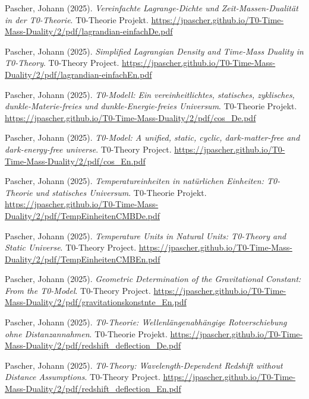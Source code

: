 \documentclass[12pt,a4paper]{article}
\begin{document}
	\begin{thebibliography}{20}
		
		Pascher, Johann (2025). 
		\textit{Vereinfachte Lagrange-Dichte und Zeit-Massen-Dualit\"at in der T0-Theorie}. 
		T0-Theorie Projekt. 
		\url{https://jpascher.github.io/T0-Time-Mass-Duality/2/pdf/lagrandian-einfachDe.pdf}
		
		Pascher, Johann (2025). 
		\textit{Simplified Lagrangian Density and Time-Mass Duality in T0-Theory}. 
		T0-Theory Project. 
		\url{https://jpascher.github.io/T0-Time-Mass-Duality/2/pdf/lagrandian-einfachEn.pdf}
		
		Pascher, Johann (2025). 
		\textit{T0-Modell: Ein vereinheitlichtes, statisches, zyklisches, dunkle-Materie-freies und dunkle-Energie-freies Universum}. 
		T0-Theorie Projekt. 
		\url{https://jpascher.github.io/T0-Time-Mass-Duality/2/pdf/cos_De.pdf}
		
		Pascher, Johann (2025). 
		\textit{T0-Model: A unified, static, cyclic, dark-matter-free and dark-energy-free universe}. 
		T0-Theory Project. 
		\url{https://jpascher.github.io/T0-Time-Mass-Duality/2/pdf/cos_En.pdf}
		
		Pascher, Johann (2025). 
		\textit{Temperatureinheiten in nat\"urlichen Einheiten: T0-Theorie und statisches Universum}. 
		T0-Theorie Projekt. 
		\url{https://jpascher.github.io/T0-Time-Mass-Duality/2/pdf/TempEinheitenCMBDe.pdf}
		
		Pascher, Johann (2025). 
		\textit{Temperature Units in Natural Units: T0-Theory and Static Universe}. 
		T0-Theory Project. 
		\url{https://jpascher.github.io/T0-Time-Mass-Duality/2/pdf/TempEinheitenCMBEn.pdf}
		
		Pascher, Johann (2025). 
		\textit{Geometric Determination of the Gravitational Constant: From the T0-Model}. 
		T0-Theory Project. 
		\url{https://jpascher.github.io/T0-Time-Mass-Duality/2/pdf/gravitationskonstnte_En.pdf}
		
		Pascher, Johann (2025). 
		\textit{T0-Theorie: Wellenlängenabhängige Rotverschiebung ohne Distanzannahmen}. 
		T0-Theorie Projekt. 
		\url{https://jpascher.github.io/T0-Time-Mass-Duality/2/pdf/redshift_deflection_De.pdf}
		
		Pascher, Johann (2025). 
		\textit{T0-Theory: Wavelength-Dependent Redshift without Distance Assumptions}. 
		T0-Theory Project. 
		\url{https://jpascher.github.io/T0-Time-Mass-Duality/2/pdf/redshift_deflection_En.pdf}
		

\end{thebibliography}
\end{document}
